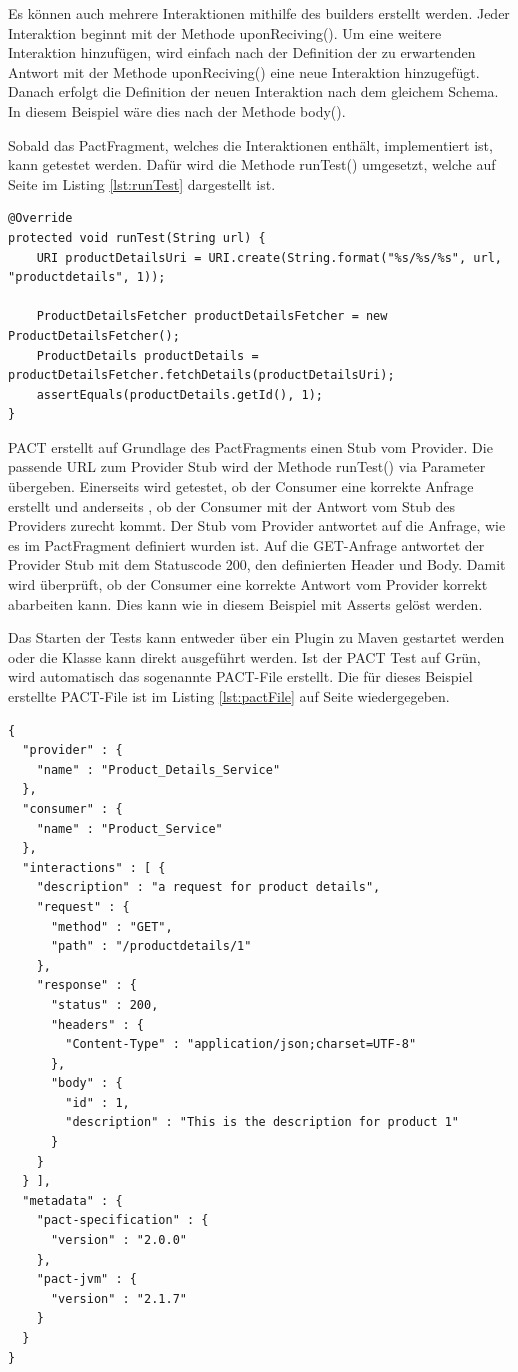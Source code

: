 \documentclass{llncs}
\begin{document}
Es können auch mehrere Interaktionen mithilfe des builders erstellt werden. Jeder Interaktion beginnt mit der Methode uponReciving(). Um eine weitere Interaktion hinzufügen, wird einfach nach der Definition der zu erwartenden Antwort mit der Methode uponReciving() eine neue Interaktion hinzugefügt. Danach erfolgt die Definition der neuen Interaktion nach dem gleichem Schema. In diesem Beispiel wäre dies nach der Methode body().

Sobald das PactFragment, welches die Interaktionen enthält, implementiert ist, kann getestet werden. Dafür wird die Methode runTest() umgesetzt, welche auf Seite \pageref{lst:runTest} im Listing \ref{lst:runTest} dargestellt ist.

\lstset{language = Java}
\begin{lstlisting}[caption=Implementierung runTest(),label=lst:runTest]
@Override
protected void runTest(String url) {
    URI productDetailsUri = URI.create(String.format("%s/%s/%s", url, "productdetails", 1));

    ProductDetailsFetcher productDetailsFetcher = new ProductDetailsFetcher();
    ProductDetails productDetails =  productDetailsFetcher.fetchDetails(productDetailsUri);
    assertEquals(productDetails.getId(), 1);
}
\end{lstlisting}

PACT erstellt auf Grundlage des PactFragments einen Stub vom Provider. Die passende URL zum Provider Stub wird der Methode runTest() via Parameter übergeben. Einerseits wird getestet, ob der Consumer eine korrekte Anfrage erstellt und anderseits , ob der Consumer mit der Antwort vom Stub des Providers zurecht kommt. Der Stub vom Provider antwortet auf die Anfrage, wie es im PactFragment definiert wurden ist. Auf die GET-Anfrage antwortet der Provider Stub mit dem Statuscode 200, den definierten Header und Body. Damit wird überprüft, ob der Consumer eine korrekte Antwort vom Provider korrekt abarbeiten kann. Dies kann wie in diesem Beispiel mit Asserts gelöst werden.

Das Starten der Tests kann entweder über ein Plugin zu Maven gestartet werden oder die Klasse kann direkt ausgeführt werden. Ist der PACT Test auf Grün, wird automatisch das sogenannte PACT-File erstellt. Die für dieses Beispiel erstellte PACT-File ist im Listing \ref{lst:pactFile} auf Seite \pageref{lst:pactFile} wiedergegeben.
\lstset{language = Java}
\begin{lstlisting}[caption=PACT-File,label=lst:pactFile]
{
  "provider" : {
    "name" : "Product_Details_Service"
  },
  "consumer" : {
    "name" : "Product_Service"
  },
  "interactions" : [ {
    "description" : "a request for product details",
    "request" : {
      "method" : "GET",
      "path" : "/productdetails/1"
    },
    "response" : {
      "status" : 200,
      "headers" : {
        "Content-Type" : "application/json;charset=UTF-8"
      },
      "body" : {
        "id" : 1,
        "description" : "This is the description for product 1"
      }
    }
  } ],
  "metadata" : {
    "pact-specification" : {
      "version" : "2.0.0"
    },
    "pact-jvm" : {
      "version" : "2.1.7"
    }
  }
}
\end{lstlisting}
\end{document}
